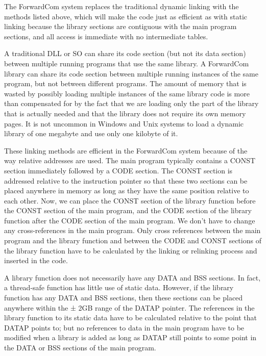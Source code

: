\documentclass[forwardcom.tex]{subfiles}
\begin{document}
The ForwardCom system replaces the traditional dynamic linking with the methods listed above, which will make the code just as efficient as with static linking because the library sections are contiguous with the main program sections, and all access is immediate with no intermediate tables. 
\vv

A traditional DLL or SO can share its code section (but not its data section) between multiple running programs that use the same library. A ForwardCom library can share its code section between multiple running instances of the same program, but not between different programs. The amount of memory that is wasted by possibly loading multiple instances of the same library code is more than compensated for by the fact that we are loading only the part of the library that is actually needed and that the library does not require its own memory pages. It is not uncommon in Windows and Unix systems to load a dynamic library of one megabyte and use only one kilobyte of it. 
\vv

These linking methods are efficient in the ForwardCom system because of the way relative addresses are used. The main program typically contains a CONST section immediately followed by a CODE section. The CONST section is addressed relative to the instruction pointer so that these two sections can be placed anywhere in memory as long as they have the same position relative to each other. Now, we can place the CONST section of the library function before the CONST section of the main program, and the CODE section of the library function after the CODE section of the main program. We don't have to change any cross-references in the main program. Only cross references between the main program and the library function and between the CODE and CONST sections of the library function have to be calculated by the linking or relinking process and inserted in the code.
\vv

A library function does not necessarily have any DATA and BSS sections. In fact, a thread-safe function has little use of static data. However, if the library function has any DATA and BSS sections, then these sections can be placed anywhere within the ± 2GB range of the DATAP pointer. The references in the library function to its static data have to be calculated relative to the point that DATAP points to; but no references to data in the main program have to be modified when a library is added as long as DATAP still points to some point in the DATA or BSS sections of the main program. 
\vv
\end{document}
